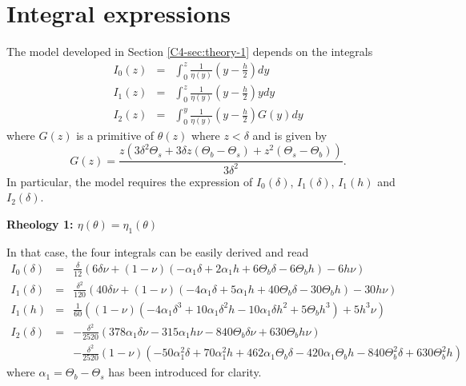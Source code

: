 \section{Integral expressions}
\label{sec:integral-expressions}

The model  developed in  Section \ref{C4-sec:theory-1} depends  on the
integrals
\begin{eqnarray}
  I_0(z)&=&\int_0^z\frac{1}{\eta(y)}\left(y-\frac{h}{2}\right)
            dy \\
  I_1(z) &=& \int_0^z\frac{1}{\eta(y)}\left(y-\frac{h}{2}\right)y dy\\
  I_2(z)&=&\int_0^y                         \frac{1}{\eta(y)}
            \left(y-\frac{h}{2}\right)G(y)dy
\end{eqnarray}
where $G(z)$  is a  primitive of $\theta(z)$  where $z<\delta$  and is
given by
\begin{equation}
  G(z) = \frac{z \left(3 \delta ^2 \Theta_s+3 \delta z (\Theta_b-\Theta_s)+z^2 (\Theta_s-\Theta_b)\right)}{3 \delta ^2}.
\end{equation}
In  particular, the  model requires  the expression  of $I_0(\delta)$,
$I_1(\delta)$, $I_1(h)$ and $I_2(\delta)$.

\vspace{.5cm}   \textbf{Rheology   1:   $\eta(\theta)=\eta_1(\theta)$}
\vspace{.5cm}

In that case, the four integrals can be easily derived and read
\begin{eqnarray}
  I_0(\delta)&=&\frac{\delta}{12} \left(6 \delta \nu + (1-\nu) \left(- \alpha_1 \delta + 2 \alpha_1 h + 6 \Theta_{b} \delta - 6 \Theta_{b} h\right) - 6 h \nu\right)\nonumber\\
  I_1(\delta)&=&\frac{\delta^{2}}{120} \left(40 \delta \nu + (1-\nu) \left(- 4 \alpha_1 \delta + 5 \alpha_1 h + 40 \Theta_{b} \delta - 30 \Theta_{b} h\right) - 30 h \nu\right)\nonumber\\
  I_1(h)&=&\frac{1}{60} \left((1-\nu) \left(- 4 \alpha_1 \delta^{3} + 10 \alpha_1 \delta^{2} h - 10 \alpha_1 \delta h^{2} + 5 \Theta_{b} h^{3}\right) + 5 h^{3} \nu\right)\nonumber\\
  I_2(\delta)&=&- \frac{\delta^{2}}{2520} \left(378  \alpha_1 \delta \nu -
                 315  \alpha_1 h  \nu -  840 \Theta_{b}  \delta \nu  + 630
                 \Theta_{b} h \nu \right)\nonumber\\
             &&-\frac{\delta^{2}}{2520}(1-\nu)  \left(- 50  \alpha_1^{2} \delta  + 70
                \alpha_1^{2}  h  +  462  \alpha_1   \Theta_{b}  \delta  -  420  \alpha_1
                \Theta_{b}  h -  840  \Theta_{b}^{2} \delta  + 630  \Theta_{b}^{2}
                h\right)\nonumber
\end{eqnarray}
where $\alpha_1=\Theta_b-\Theta_s$ has been introduced for clarity.

